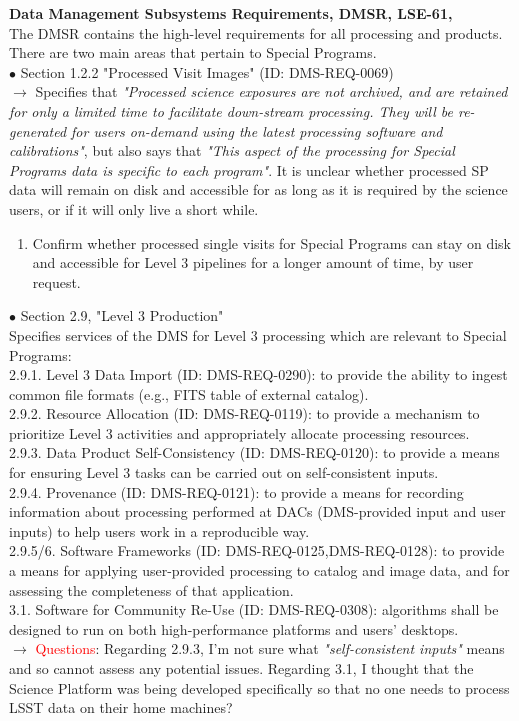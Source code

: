 \documentclass[DM,lsstdraft,toc]{lsstdoc}
\begin{document}
\noindent \textbf{Data Management Subsystems Requirements, DMSR, LSE-61, \cite{LSE-61}} \\
The DMSR contains the high-level requirements for all processing and products. There are two main areas that pertain to Special Programs. \\
$\bullet$ Section 1.2.2 "Processed Visit Images" (ID: DMS-REQ-0069)\\
$\rightarrow$ Specifies that {\it "Processed science exposures are not archived, and are retained for only a limited time to facilitate down-stream processing. They will be re-generated for users on-demand using the latest processing software and calibrations"}, but also says that {\it "This aspect of the processing for Special Programs data is specific to each program"}. It is unclear whether processed SP data will remain on disk and accessible for as long as it is required by the science users, or if it will only live a short while.
\begin{enumerate}[topsep=-10pt,label= \textbf{Concern \Roman*.},resume] \item \label{C6} Confirm whether processed single visits for Special Programs can stay on disk and accessible for Level 3 pipelines for a longer amount of time, by user request. \end{enumerate}
$\bullet$ Section 2.9, "Level 3 Production" \\
Specifies services of the DMS for Level 3 processing which are relevant to Special Programs: \\
2.9.1. Level 3 Data Import (ID: DMS-REQ-0290): to provide the ability to ingest common file formats (e.g., FITS table of external catalog). \\
2.9.2. Resource Allocation (ID: DMS-REQ-0119): to provide a mechanism to prioritize Level 3 activities and appropriately allocate processing resources. \\
2.9.3. Data Product Self-Consistency (ID: DMS-REQ-0120): to provide a means for ensuring Level 3 tasks can be carried out on self-consistent inputs. \\
2.9.4. Provenance (ID: DMS-REQ-0121): to provide a means for recording information about processing performed at DACs (DMS-provided input and user inputs) to help users work in a reproducible way. \\
2.9.5/6. Software Frameworks (ID: DMS-REQ-0125,DMS-REQ-0128): to provide a means for applying user-provided processing to catalog and image data, and for assessing the completeness of that application. \\
3.1. Software for Community Re-Use (ID: DMS-REQ-0308): algorithms shall be designed to run on both high-performance platforms and users' desktops. \\
$\rightarrow$ \textcolor{red}{Questions}: Regarding 2.9.3, I'm not sure what {\it "self-consistent inputs"} means and so cannot assess any potential issues. Regarding 3.1, I thought that the Science Platform was being developed specifically so that no one needs to process LSST data on their home machines?
\end{document}
